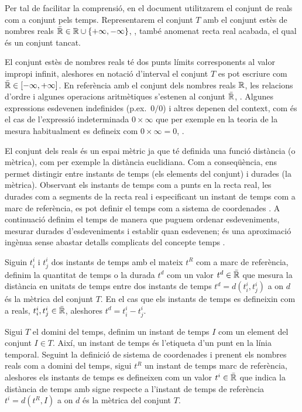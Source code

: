 Per tal de facilitar la comprensió, en el document utilitzarem el
conjunt de reals com a conjunt pels temps. Representarem el conjunt
$T$ amb el conjunt estès de nombres reals $\bar{\mathbb{R}{}} \in
\mathbb{R}{} \cup
\{+\infty,-\infty\}$, \parencite{wiki:extendedreal,cantrell:extendedreal},
també anomenat recta real acabada, el qual és un conjunt tancat.

El conjunt estès de nombres reals té dos punts límits corresponents al
valor impropi infinit, aleshores en notació d'interval el conjunt $T$
es pot escriure com $\bar{\mathbb{R}{}} \in [-\infty,+\infty]$. En referència
amb el conjunt dels nombres reals $\mathbb{R}{}$, les relacions d'ordre i
algunes operacions aritmètiques s'estenen al conjunt $\bar{\mathbb{R}{}}$,
\cite{cantrell:extendedreal}.  Algunes expressions esdevenen
indefinides (p.ex.\ $0/0$) i altres depenen del context, com és el cas
de l'expressió indeterminada $0 \times \infty$ que per exemple en la
teoria de la mesura habitualment es defineix com $0 \times \infty =
0$, \cite{wiki:extendedreal}.


El conjunt dels reals és un espai mètric ja que té definida una funció
distància (o mètrica), com per exemple la distància euclidiana. Com a
conseqüència, ens permet distingir entre instants de temps (els
elements del conjunt) i durades (la mètrica). Observant els instants
de temps com a punts en la recta real, les durades com a segments de
la recta real i especificant un instant de temps com a marc de
referència, es pot definir el temps com a sistema de
coordenades \parencite{iep:time-supplement,wiki:coordinate,kopetz11:realtime}. A
continuació definim el temps de manera que puguem ordenar
esdeveniments, mesurar durades d'esdeveniments i establir quan
esdevenen; és una aproximació ingènua sense abastar detalls complicats
del concepte temps \parencite{iep:time}.




\begin{definition}[Temps]
  \label{def:model:temps}
  Siguin $t^i_i$ i $t^i_j$ dos instants de temps amb el mateix $t^R$
  com a marc de referència, definim la quantitat de temps o la durada
  $t^d$ com un valor $t^d \in\bar{\mathbb{R}{}}$ que mesura la distància en
  unitats de temps entre dos instants de temps $t^d = d(t^i_i,t^i_j)$
  a on $d$ és la mètrica del conjunt $T$. En el cas que els instants
  de temps es defineixin com a reals, $t^i_i , t^i_j \in \bar{\mathbb{R}{}}$,
  aleshores $t^d = t^i_i - t^i_j$.

  Sigui $T$ el domini del temps, definim un instant de temps $I$ com
  un element del conjunt $I \in T$. Així, un instant de temps és
  l'etiqueta d'un punt en la línia temporal. Seguint la definició de
  sistema de coordenades i prenent els nombres reals com a domini del
  temps, sigui $t^{R}$ un instant de temps marc de referència,
  aleshores els instants de temps es defineixen com un valor $t^i
  \in\bar{\mathbb{R}{}}$ que indica la distància de temps amb signe respecte a
  l'instant de temps de referència $t^i= d(t^{R},I)$ a on $d$ és la
  mètrica del conjunt $T$.
\end{definition}

